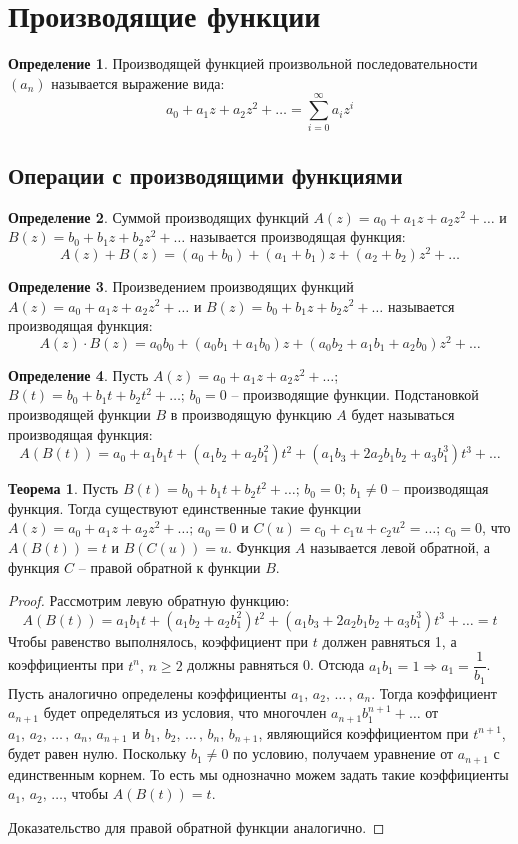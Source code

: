 \documentclass[12pt]{article}
\theoremstyle{definition}
\newtheorem{theorem}{Теорема}[section]
\newtheorem{definition}{Определение}
\begin{document}
\section{Производящие функции}

\begin{definition}
    Производящей функцией произвольной последовательности $(a_n)$ называется выражение вида:
    $$a_0+a_1z+a_2z^2+\ldots=\sum_{i=0}^{\infty}a_iz^i$$
\end{definition}

\subsection{Операции с производящими функциями}

\begin{definition}
    Суммой производящих функций $A(z)=a_0+a_1z+a_2z^2+\ldots$ и $B(z)=b_0+b_1z+b_2z^2+\ldots$ называется производящая функция:
    $$A(z)+B(z)=(a_0+b_0)+(a_1+b_1)z+(a_2+b_2)z^2+\ldots$$
\end{definition}
\begin{definition}
    Произведением производящих функций $A(z)=a_0+a_1z+a_2z^2+\ldots$ и $B(z)=b_0+b_1z+b_2z^2+\ldots$ называется производящая функция:
    $$A(z)\cdot B(z)=a_0b_0+(a_0b_1+a_1b_0)z+(a_0b_2+a_1b_1+a_2b_0)z^2+\ldots$$
\end{definition}
\begin{definition}
    Пусть $A(z)=a_0+a_1z+a_2z^2+\ldots$; $B(t)=b_0+b_1t+b_2t^2+\ldots;\,b_0=0$ – производящие функции. Подстановкой производящей функции $B$ в производящую функцию $A$ будет называться производящая функция:
    $$A(B(t))=a_0+a_1b_1t+(a_1b_2+a_2b_1^2)t^2+(a_1b_3+2a_2b_1b_2+a_3b_1^3)t^3+\ldots$$
\end{definition}
\begin{theorem}
    Пусть $B(t)=b_0+b_1t+b_2t^2+\ldots;\,b_0=0;\,b_1\neq 0$ – производящая функция. Тогда существуют единственные такие функции $A(z)=a_0+a_1z+a_2z^2+\ldots;\,a_0=0$ и $C(u)=c_0+c_1u+c_2u^2=\ldots;\,c_0=0$, что $A(B(t))=t$ и $B(C(u))=u.$ Функция $A$ называется левой обратной, а функция $C$ – правой обратной к функции $B$.
\end{theorem}
\begin{proof}
    Рассмотрим левую обратную функцию:
    $$A(B(t))=a_1b_1t+(a_1b_2+a_2b_1^2)t^2+(a_1b_3+2a_2b_1b_2+a_3b_1^3)t^3+\ldots=t$$
    Чтобы равенство выполнялось, коэффициент при $t$ должен равняться 1, а коэффициенты при $t^n,\,n\geq 2$ должны равняться 0. Отсюда $a_1b_1=1\Longrightarrow a_1=\dfrac{1}{b_1}$. Пусть аналогично определены коэффициенты $a_1,\,a_2,\,\ldots\,,\,a_n$. Тогда коэффициент $a_{n+1}$ будет определяться из условия, что многочлен $a_{n+1}b^{n+1}_1+\ldots$ от $a_1,\,a_2,\,\ldots\,,\,a_n,\,a_{n+1}$ и $b_1,\,b_2,\,\ldots\,,\,b_n,\,b_{n+1}$, являющийся коэффициентом при $t^{n+1}$, будет равен нулю. Поскольку $b_1\neq 0$ по условию, получаем уравнение от $a_{n+1}$ с единственным корнем. То есть мы однозначно можем задать такие коэффициенты $a_1,\,a_2,\,\ldots$, чтобы $A(B(t))=t$.\bigskip
    
    Доказательство для правой обратной функции аналогично.
\end{proof}
\end{document}
